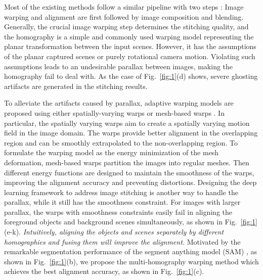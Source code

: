 \documentclass[10pt,twocolumn,letterpaper]{article}
\begin{document}
Most of the existing methods follow a similar pipeline with two steps \cite{szeliski2006image}: 
Image warping and alignment are first followed by image composition and blending. Generally, the crucial image warping step determines the stitching quality, and the homography is a simple and commonly used warping model representing the planar transformation between the input scenes. 
However, it has the assumptions of the planar captured scenes or purely rotational camera motion.
Violating such assumptions leads to an undesirable parallax between images, making the homography fail to deal with. As the case of Fig.~\ref{fig:1}(d) shows, severe ghosting artifacts are generated in the stitching results.

To alleviate the artifacts caused by parallax, adaptive warping models are proposed using either spatially-varying warps \cite{gao2011constructing,chang2014shape,Lee_2020_CVPR,li2017quasi,li2019local,lin2015adaptive,liu2019shape,zaragoza2014projective,Zheng2019tmm,lin2022image} or mesh-based warps \cite{chang2014SpatiallyVarying,chen2016natural,zhang2016multi,xiang2018Image,liao2020Single,jia2021Leveraging,li2021image,zhang2021natural,chen2021Image,du2022Geometric}.
In particular, the spatially varying warps aim to create a spatially varying motion field in the image domain. The warps provide better alignment in the overlapping region and can be smoothly extrapolated to the non-overlapping region. To formulate the warping model as the energy minimization of the mesh deformation, mesh-based warps partition the images into regular meshes. 
Then different energy functions are designed to maintain the smoothness of the warps, improving the alignment accuracy and preventing distortions. Designing the deep learning framework to address image stitching \cite{nie2023parallax} is another way to handle the parallax, while it still has the smoothness constraint. For images with larger parallax, the warps with smoothness constraints easily fail in aligning the foreground objects and background scenes simultaneously, as shown in Fig.~\ref{fig:1}(e-k). \textit{Intuitively, aligning the objects and scenes separately by different homographies and fusing them will improve the alignment.} Motivated by the remarkable segmentation performance of the segment anything model (SAM) \cite{kirillov2023segment}, as shown in Fig.~\ref{fig:1}(b), we propose the multi-homography warping method which achieves the best alignment accuracy, as shown in Fig.~\ref{fig:1}(c).
\end{document}
